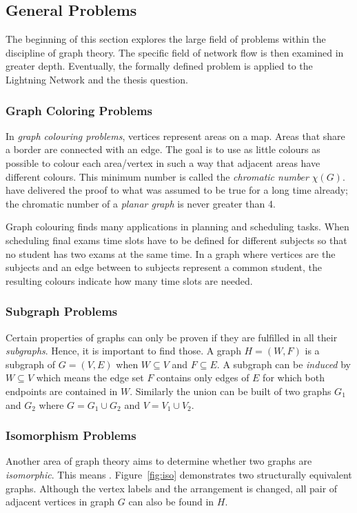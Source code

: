 \documentclass[final]{fhnwreport}       %
\begin{document}
\subsection{General Problems}\label{subsec:genprob}
The beginning of this section explores the large field of problems within the discipline of graph theory. The specific field of network flow is then examined in greater depth. Eventually, the formally defined problem is applied to the Lightning Network and the thesis question.

\subsubsection{Graph Coloring Problems}
In \emph{graph colouring problems}, vertices represent areas on a map. Areas that share a border are connected with an edge. The goal is to use as little colours as possible to colour each area/vertex in such a way that adjacent areas have different colours. This minimum number is called the \emph{chromatic number} $\chi(G)$. \textcite{steen_four-color_1978} have delivered the proof to what was assumed to be true for a long time already; the chromatic number of a \emph{planar graph} is never greater than 4. 

Graph colouring finds many applications in planning and scheduling tasks. When scheduling final exams time slots have to be defined for different subjects so that no student has two exams at the same time. In a graph where vertices are the subjects and an edge between to subjects represent a common student, the resulting colours indicate how many time slots are needed.

\subsubsection{Subgraph Problems}
Certain properties of graphs can only be proven if they are fulfilled in all their \emph{subgraphs}. Hence, it is important to find those. A graph $H = (W, F)$ is a subgraph of $G = (V, E)$ when $W \subseteq V$ and $F \subseteq E$. A subgraph can be \emph{induced} by $W \subseteq V$ which means the edge set $F$ contains only edges of $E$ for which both endpoints are contained in $W$. Similarly the union can be built of two graphs $G_1$ and $G_2$ where $G = G_1 \cup G_2$ and $V = V_1 \cup V_2$. 

\subsubsection{Isomorphism Problems}
Another area of graph theory aims to determine whether two graphs are \emph{isomorphic}. This means . Figure~\ref{fig:iso} demonstrates two structurally equivalent graphs. Although the vertex labels and the arrangement is changed, all pair of adjacent vertices in graph $G$ can also be found in $H$. 
\end{document}
